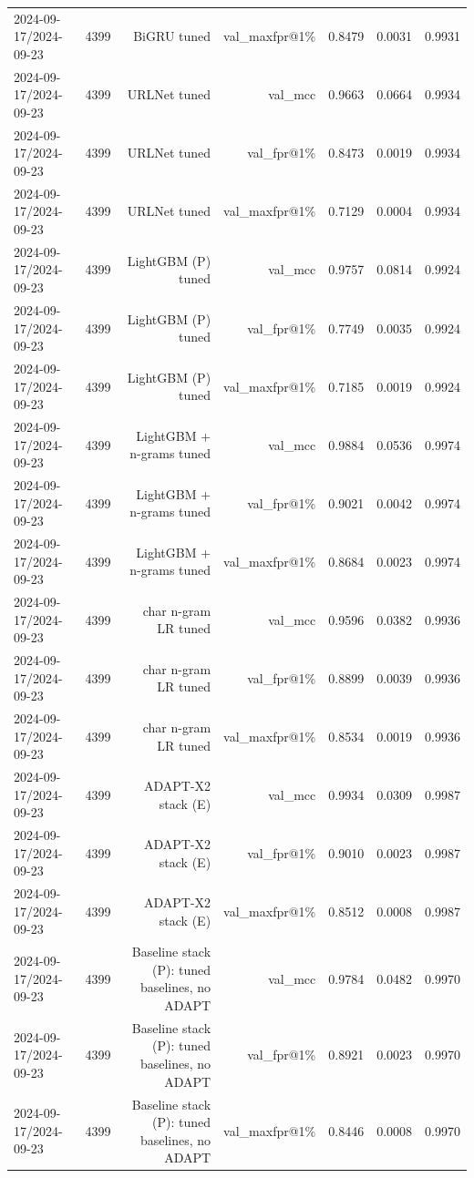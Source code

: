 \begin{table}[t]
\begin{tabular}{llrrrrr}
2024-09-17/2024-09-23 & 4399 & BiGRU tuned & val\_maxfpr@1\% & 0.8479 & 0.0031 & 0.9931 \\
2024-09-17/2024-09-23 & 4399 & URLNet tuned & val\_mcc & 0.9663 & 0.0664 & 0.9934 \\
2024-09-17/2024-09-23 & 4399 & URLNet tuned & val\_fpr@1\% & 0.8473 & 0.0019 & 0.9934 \\
2024-09-17/2024-09-23 & 4399 & URLNet tuned & val\_maxfpr@1\% & 0.7129 & 0.0004 & 0.9934 \\
2024-09-17/2024-09-23 & 4399 & LightGBM (P) tuned & val\_mcc & 0.9757 & 0.0814 & 0.9924 \\
2024-09-17/2024-09-23 & 4399 & LightGBM (P) tuned & val\_fpr@1\% & 0.7749 & 0.0035 & 0.9924 \\
2024-09-17/2024-09-23 & 4399 & LightGBM (P) tuned & val\_maxfpr@1\% & 0.7185 & 0.0019 & 0.9924 \\
2024-09-17/2024-09-23 & 4399 & LightGBM + n-grams tuned & val\_mcc & 0.9884 & 0.0536 & 0.9974 \\
2024-09-17/2024-09-23 & 4399 & LightGBM + n-grams tuned & val\_fpr@1\% & 0.9021 & 0.0042 & 0.9974 \\
2024-09-17/2024-09-23 & 4399 & LightGBM + n-grams tuned & val\_maxfpr@1\% & 0.8684 & 0.0023 & 0.9974 \\
2024-09-17/2024-09-23 & 4399 & char n-gram LR tuned & val\_mcc & 0.9596 & 0.0382 & 0.9936 \\
2024-09-17/2024-09-23 & 4399 & char n-gram LR tuned & val\_fpr@1\% & 0.8899 & 0.0039 & 0.9936 \\
2024-09-17/2024-09-23 & 4399 & char n-gram LR tuned & val\_maxfpr@1\% & 0.8534 & 0.0019 & 0.9936 \\
2024-09-17/2024-09-23 & 4399 & ADAPT-X2 stack (E) & val\_mcc & 0.9934 & 0.0309 & 0.9987 \\
2024-09-17/2024-09-23 & 4399 & ADAPT-X2 stack (E) & val\_fpr@1\% & 0.9010 & 0.0023 & 0.9987 \\
2024-09-17/2024-09-23 & 4399 & ADAPT-X2 stack (E) & val\_maxfpr@1\% & 0.8512 & 0.0008 & 0.9987 \\
2024-09-17/2024-09-23 & 4399 & Baseline stack (P): tuned baselines, no ADAPT & val\_mcc & 0.9784 & 0.0482 & 0.9970 \\
2024-09-17/2024-09-23 & 4399 & Baseline stack (P): tuned baselines, no ADAPT & val\_fpr@1\% & 0.8921 & 0.0023 & 0.9970 \\
2024-09-17/2024-09-23 & 4399 & Baseline stack (P): tuned baselines, no ADAPT & val\_maxfpr@1\% & 0.8446 & 0.0008 & 0.9970 \\

\end{tabular}
\end{table}
